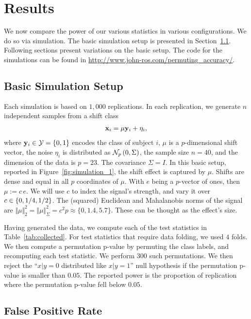 \documentclass[onecolumn,draftclsnofoot]{IEEEtran}
\begin{document}
\section{Results}
\label{sec:results}
We now compare the power of our various statistics in various configurations. 
We do so via simulation.
The basic simulation setup is presented in Section~\ref{sec:simulation_details}.
Following sections present variations on the basic setup.
The \R code for the simulations can be found in \url{http://www.john-ros.com/permuting_accuracy/}.


\subsection{Basic Simulation Setup}
\label{sec:simulation_details}

Each simulation is based on $1,000$ replications. 
In each replication, we generate $n$ independent samples from a shift class 
\begin{align}
\label{eq:distribution}
\x_i = \mu \y_i + \eta_i,
\end{align}
where $\mathbf{y}_i \in \mathcal{Y}=\{ 0,1 \}$ encodes the class of subject $i$, $\mu$ is a $p$-dimensional shift vector, the noise $\eta_i$ is distributed as $\mathcal{N}_{p}\left(0,\Sigma\right)$, the sample size $n=40$, and the dimension of the data is $p=23$. 
The covariance $\Sigma=I$. 
In this basic setup, reported in Figure~\ref{fig:simulation_1}, the shift effect is captured by $\mu$. 
Shifts are dense and equal in all $p$ coordinates of $\mu$.
With $e$ being a $p$-vector of ones, then $\mu:=c \, e$. 
We will use $c$ to index the signal's strength, and vary it over $c \in \{ 0,1/4,1/2 \}$.
The (squared) Euclidean and Mahalanobis norms of the signal are $\Vert \mu \Vert_2^2=\Vert \mu \Vert_\Sigma^2=c^2 p\approx \{0,1.4,5.7\}$.
These can be thought as the effect's size. 


Having generated the data, we compute each of the test statistics in Table~\ref{tab:collected}.
For test statistics that require data folding, we used $4$ folds. 
We then compute a permutation p-value by permuting the class labels, and recomputing each test statistic. 
We perform $300$ such permutations. 
We then reject the ``$x|y=0$ distributed like $x|y=1$'' null hypothesis if the permutation p-value is smaller than $0.05$.
The reported power is the proportion of replication where the permutation p-value fell below $0.05$.



\subsection{False Positive Rate}
\label{sec:type_i}
\end{document}
